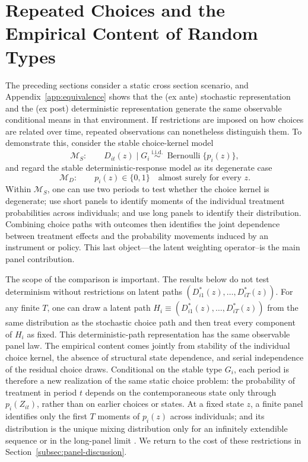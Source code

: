 \documentclass[11pt]{article}
\newcommand{\1}{\mathbf{1}}
\begin{document}
\section{Repeated Choices and the Empirical Content of Random Types}
\label{sec:panel}

The preceding sections consider a static cross section scenario, and Appendix~\ref{app:equivalence} shows that the (ex ante) stochastic representation and the (ex post) deterministic representation generate the same observable conditional means in that environment. If restrictions are imposed on how choices are related over time, repeated observations can nonetheless distinguish them. To demonstrate this, consider the stable choice-kernel model
\[
\mathcal M_S:\qquad
D_{it}(z)\mid G_i \ \stackrel{\mathrm{i.i.d.}}{\sim}\
\operatorname{Bernoulli}\{p_i(z)\},
\]
and regard the stable deterministic-response model as its degenerate case
\[
\mathcal M_D:\qquad p_i(z)\in\{0,1\}\quad\text{almost surely for every }z.
\]
Within $\mathcal M_S$, one can use two periods to test whether the choice kernel is degenerate; use short panels to identify moments of the individual treatment probabilities across individuals; and use long panels to identify their distribution. Combining choice paths with outcomes then identifies the joint dependence between treatment effects and the probability movements induced by an instrument or policy. This last object---the latent weighting operator--is the main panel contribution.

The scope of the comparison is important. The results below do not test determinism without restrictions on latent paths $(D_{i1}^{*}(z),\ldots,D_{iT}^{*}(z))$. For any finite $T$, one can draw a latent path $H_i\equiv(D_{i1}^{*}(z),\ldots,D_{iT}^{*}(z))$ from the same distribution as the stochastic choice path and then treat every component of $H_i$ as fixed. This deterministic-path representation has the same observable panel law.
The empirical content comes jointly from stability of the individual choice
kernel, the absence of structural state dependence, and serial independence of
the residual choice draws. Conditional on the stable type \(G_i\), each period
is therefore a new realization of the same static choice problem: the
probability of treatment in period \(t\) depends on the contemporaneous state
only through \(p_i(Z_{it})\), rather than on earlier choices or states. At a fixed state $z$, a finite panel identifies only the first $T$ moments of $p_i(z)$ across individuals; and its distribution is the unique mixing distribution only for an infinitely extendible sequence or in the long-panel limit \citep{diaconisfreedman1980}. We return to the cost of these restrictions in Section~\ref{subsec:panel-discussion}.
\end{document}
